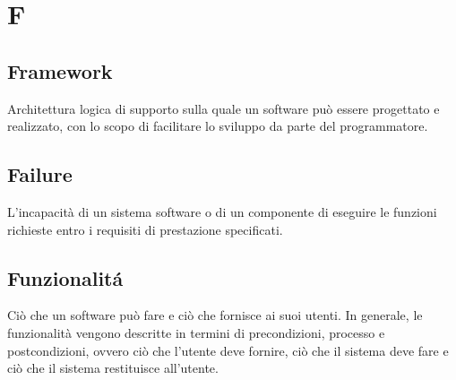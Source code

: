 \section{F}
\subsection{Framework}%
Architettura logica di supporto sulla quale un software può essere progettato e realizzato, con lo scopo di facilitare lo sviluppo da parte del programmatore.
\subsection{Failure}%
L'incapacità di un sistema software o di un componente di eseguire le funzioni richieste entro i requisiti di prestazione specificati.
\subsection{Funzionalitá}%
Ciò che un software può fare e ciò che fornisce ai suoi utenti.
In generale, le funzionalità vengono descritte in termini di precondizioni, processo e postcondizioni, ovvero ciò che l'utente deve fornire, 
ciò che il sistema deve fare e ciò che il sistema restituisce all'utente.
\clearpage